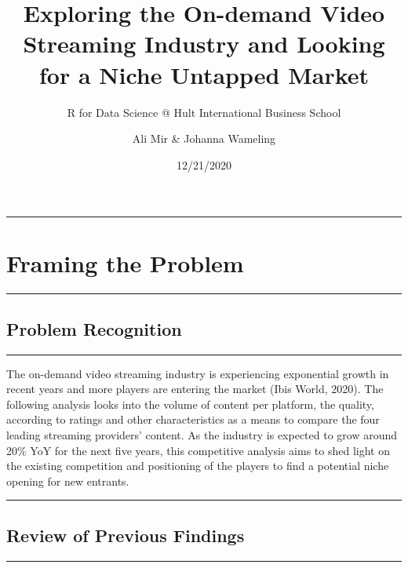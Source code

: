 \documentclass[
]{article}
\title{Exploring the On-demand Video Streaming Industry and Looking for
a Niche Untapped Market}
\subtitle{R for Data Science @ Hult International Business School}
\author{Ali Mir \& Johanna Wameling}
\date{12/21/2020}
\begin{document}
\maketitle

{
\setcounter{tocdepth}{2}
\tableofcontents
}
\begin{center}\rule{0.5\linewidth}{0.5pt}\end{center}

\hypertarget{framing-the-problem}{%
\section{Framing the Problem}\label{framing-the-problem}}

\begin{center}\rule{0.5\linewidth}{0.5pt}\end{center}

\hypertarget{problem-recognition}{%
\subsection{Problem Recognition}\label{problem-recognition}}

\begin{center}\rule{0.5\linewidth}{0.5pt}\end{center}

The on-demand video streaming industry is experiencing exponential
growth in recent years and more players are entering the market (Ibis
World, 2020). The following analysis looks into the volume of content
per platform, the quality, according to ratings and other
characteristics as a means to compare the four leading streaming
providers' content. As the industry is expected to grow around 20\% YoY
for the next five years, this competitive analysis aims to shed light on
the existing competition and positioning of the players to find a
potential niche opening for new entrants.

\begin{center}\rule{0.5\linewidth}{0.5pt}\end{center}

\hypertarget{review-of-previous-findings}{%
\subsection{Review of Previous
Findings}\label{review-of-previous-findings}}

\begin{center}\rule{0.5\linewidth}{0.5pt}\end{center}
\end{document}
